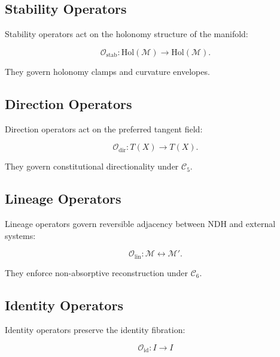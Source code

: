 \subsection{Stability Operators}

Stability operators act on the holonomy structure of the manifold:

\[
\mathcal{O}_{\mathrm{stab}} :
\mathrm{Hol}(\mathcal{M}) \to \mathrm{Hol}(\mathcal{M}).
\]

They govern holonomy clamps and curvature envelopes.


\subsection{Direction Operators}

Direction operators act on the preferred tangent field:

\[
\mathcal{O}_{\mathrm{dir}} :
T(X) \to T(X).
\]

They govern constitutional directionality under $\mathcal{C}_5$.


\subsection{Lineage Operators}

Lineage operators govern reversible adjacency between NDH and external
systems:

\[
\mathcal{O}_{\mathrm{lin}} :
\mathcal{M} \leftrightarrow \mathcal{M}'.
\]

They enforce non-absorptive reconstruction under $\mathcal{C}_6$.


\subsection{Identity Operators}

Identity operators preserve the identity fibration:

\[
\mathcal{O}_{\mathrm{id}} :
I \to I
\]

